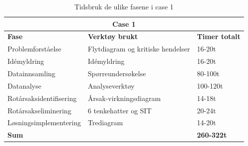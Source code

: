 \begin{table}[H]
  \centering
  \caption{Tidsbruk de ulike fasene i case 1}
    \begin{tabular}{|lr|l|}
    \hline
    \multicolumn{3}{|c|}{\cellcolor{yellow}\textbf{Case 1}} \\ 
    \hline
    \multicolumn{1}{|l|}{\cellcolor{apricot}\textbf{Fase}} & \multicolumn{1}{l|}{\cellcolor{apricot}\textbf{Verktøy brukt}} & \cellcolor{apricot}\textbf{Timer totalt} \\
    \hline
    \multicolumn{1}{|l|}{Problemforståelse} & \multicolumn{1}{l|}{Flytdiagram og kritiske hendelser} & 16-20t \\
    \hline
    \multicolumn{1}{|l|}{Idémyldring} & \multicolumn{1}{l|}{Idémyldring} & 16-20t \\
    \hline
    \multicolumn{1}{|l|}{Datainnsamling} & \multicolumn{1}{l|}{Spørreundersøkelse} & 80-100t \\
    \hline
    \multicolumn{1}{|l|}{Datanalyse} & \multicolumn{1}{l|}{Analyseverktøy} & 100-120t \\
    \hline
    \multicolumn{1}{|l|}{Rotårsaksidentifisering} & \multicolumn{1}{l|}{Årsak-virkningsdiagram} & 14-18t \\
    \hline
    \multicolumn{1}{|l|}{Rotårsakseliminering} & \multicolumn{1}{l|}{6 tenkehatter og SIT} & 20-24t \\
    \hline
    \multicolumn{1}{|l|}{Løsningsimplementering} & \multicolumn{1}{l|}{Trediagram} & 14-20t \\
    \hline
    \multicolumn{2}{|l|}{\textbf{Sum}} & \textbf{260-322t} \\
    \hline
    \end{tabular}%
  \label{tab:tidsbruk_case1}%
\end{table}%
